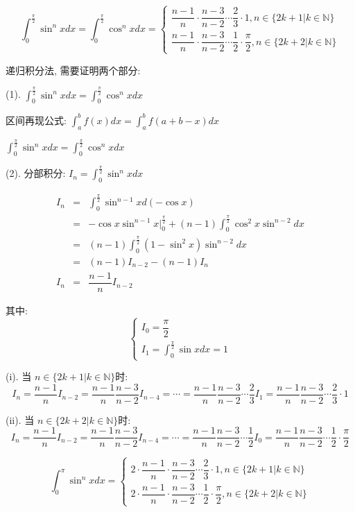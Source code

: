 \begin{theorem}[华里士公式]
	$$\int_{0}^{\frac{\pi}{2}}\sin^{n}x dx = \int_{0}^{\frac{\pi}{2}}\cos^{n} xdx =
	\begin{cases} 
	\dfrac{n-1}{n}\cdot \dfrac{n-3}{n-2}\cdots \dfrac{2}{3}\cdot 1, n\in \{2k+1|k\in \mathbb{N}\} \\
	\dfrac{n-1}{n}\cdot \dfrac{n-3}{n-2}\cdots \dfrac{1}{2}\cdot \dfrac{\pi}{2}, n\in \{2k+2|k\in \mathbb{N}\}  
	\end{cases}$$

	递归积分法, 需要证明两个部分:

	(1). $\int_{0}^{\frac{\pi}{2}}\sin^{n}x dx = \int_{0}^{\frac{\pi}{2}}\cos^{n}x dx$

	区间再现公式: $\int_{a}^{b}f(x)dx = \int_{a}^{b}f(a+b-x) dx$

	$\int_{0}^{\frac{\pi}{2}}\sin^{n}x dx = \int_{0}^{\frac{\pi}{2}}\cos^{n}x dx$

	(2). 分部积分: $I_{n} = \int_{0}^{\frac{\pi}{2}}\sin^{n} xdx$
	
	\begin{eqnarray*}
		I_{n} & = & \int_{0}^{\frac{\pi}{2}} \sin^{n-1}x d(-\cos x)\\
			  & = & -\cos x\sin^{n-1}x \big|_{0}^{\frac{\pi}{2}} + (n-1)\int_{0}^{\frac{\pi}{2}}\cos^{2}x\sin^{n-2}dx\\
			  & = & (n-1)\int_{0}^{\frac{\pi}{2}}(1-\sin^{2}x)\sin^{n-2}dx\\ 
			  & = & (n-1)I_{n-2} - (n-1)I_{n}\\
		I_{n} & = & \dfrac{n-1}{n}I_{n-2}
	\end{eqnarray*}

	其中:
	$$\begin{cases} 
		I_{0} = \dfrac{\pi}{2}  \\ 
		I_{1} = \int_{0}^{\frac{\pi}{2}}\sin xdx = 1  
	\end{cases}$$

	(i). 当 $n \in\{2k+1|k\in \mathbb{N}\}$时:
	$$I_{n} = \dfrac{n-1}{n}I_{n-2} =  \dfrac{n-1}{n}\dfrac{n-3}{n-2}I_{n-4} =\cdots =  \dfrac{n-1}{n}\dfrac{n-3}{n-2}\cdots \dfrac{2}{3}I_{1} = \dfrac{n-1}{n}\dfrac{n-3}{n-2}\cdots \dfrac{2}{3}\cdot 1$$

	(ii). 当 $n \in\{2k+2|k\in \mathbb{N}\}$时:
	$$I_{n} = \dfrac{n-1}{n}I_{n-2} =  \dfrac{n-1}{n}\dfrac{n-3}{n-2}I_{n-4} =\cdots =  \dfrac{n-1}{n}\dfrac{n-3}{n-2}\cdots \dfrac{1}{2}I_{0} = \dfrac{n-1}{n}\dfrac{n-3}{n-2}\cdots \dfrac{1}{2}\cdot \dfrac{\pi}{2}$$

	\begin{corollary}[华里士公式推论]
		$$\int_{0}^{\pi}\sin^{n}x dx =
	\begin{cases} 
		2\cdot\dfrac{n-1}{n}\cdot \dfrac{n-3}{n-2}\cdots \dfrac{2}{3}\cdot 1, n\in \{2k+1|k\in \mathbb{N}\} \\
		2\cdot\dfrac{n-1}{n}\cdot \dfrac{n-3}{n-2}\cdots \dfrac{1}{2}\cdot \dfrac{\pi}{2}, n\in \{2k+2|k\in \mathbb{N}\}  
	\end{cases}$$


\end{corollary}
\end{theorem}
